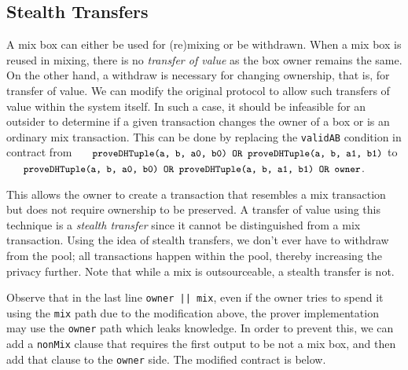 \documentclass[runningheads]{llncs}
\begin{document}
\subsection{Stealth Transfers}

A mix box can either be used for (re)mixing or be withdrawn. When a mix box is reused in mixing, there is no {\em transfer of value} as the box owner remains the same. On the other hand, a withdraw is necessary for changing ownership, that is, for transfer of value. We can modify the original protocol to allow such transfers of value within the system itself. In such a case, it should be infeasible for an outsider to determine if a given transaction changes the owner of a box or is an ordinary mix transaction. This can be done by replacing the \texttt{validAB} condition in contract from $\texttt{\small{proveDHTuple(a, b, a0, b0) OR proveDHTuple(a, b, a1, b1)}}$
to $\texttt{\small{proveDHTuple(a, b, a0, b0) OR proveDHTuple(a, b, a1, b1) OR owner}}$.

This allows the owner to create a transaction that resembles a mix transaction but does not require ownership to be preserved. 
A transfer of value using this technique is a {\em stealth transfer} since it cannot be distinguished from a mix transaction.
Using the idea of stealth transfers, we don't ever have to withdraw from the pool; all transactions happen within the pool, thereby increasing the privacy further. Note that while a mix is outsourceable, a stealth transfer is not. 

Observe that in the last line \texttt{owner || mix}, even if the owner tries to spend it using the \texttt{mix} path due to the modification above, 
the prover implementation may use the \texttt{owner} path which leaks knowledge. In order to prevent this, we can add a \texttt{nonMix} clause that requires the first output to be not a mix box, and then add that clause to the \texttt{owner} side. The modified contract is below.
\end{document}
